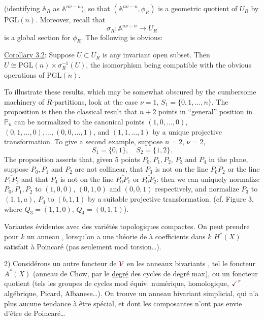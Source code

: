 
(identifying $\mathbb{A}_R$ as $\mathbb{A}^{n\nu-n}$), so that $(\mathbb{A}^{n\nu-n},\phi_R)$ is a geometric quotient of $U_R$ by $\mathrm{PGL}(n)$. Moreover, recall that
\[
\sigma_R:\mathbb{A}^{n\nu-n}\longrightarrow U_R
\]
is a global section for $\phi_R$. The following is obvious:

\uline{Corollary 3.2}: Suppose $U\subset U_R$ is any invariant open subset. Then $U\cong\mathrm{PGL}(n)\times\sigma_R^{-1}(U)$, the isomorphism being compatible with the obvious operations of $\mathrm{PGL}(n)$.

To illustrate these results, which may be somewhat obscured by the cumbersome machinery of $R$-partitions, look at the case $\nu=1$, $S_1=\{0,1,\ldots,n\}$. The proposition is then the classical result that $n+2$ points in ``general'' position in $\mathbb{P}_n$ can be normalized to the canonical points $(1,0,\ldots,0)$, $(0,1,\ldots,0),\ldots,(0,0,\ldots,1)$, and $(1,1,\ldots,1)$ by a unique projective transformation. To give a second example, suppose $n=2$, $\nu=2$,
\[
S_1=\{0,1\},\quad S_2=\{1,2\}.
\]
The proposition asserts that, given 5 points $P_0,P_1,P_2$, $P_3$ and $P_4$ in the plane, suppose $P_0,P_1$ and $P_2$ are not collinear, that $P_3$ is not on the line $\overline{P_0P_2}$ or the line $\overline{P_1P_2}$ and that $P_4$ is not on the line $\overline{P_0P_1}$ or $\overline{P_0P_2}$: then we can uniquely normalize $P_0,P_1,P_2$ to $(1,0,0)$, $(0,1,0)$ and $(0,0,1)$ respectively, and normalize $P_3$ to $(1,1,a)$, $P_4$ to $(b,1,1)$ by a suitable projective transformation. (cf. Figure 3, where $Q_3=(1,1,0)$, $Q_4=(0,1,1)$).


Variantes évidentes avec des variétés topologiques compactes.
On peut prendre pour $k$ un anneau , lorsqu'on a une théorie de  à coefficients dans $k$    $H^*(X)$ satisfait à Poincaré  (pas seulement mod torsion\ldots).

2) Considérons un autre foncteur de $\unsure{\mathcal{V}}$ en les anneaux bivariants , tel le foncteur $A^*(X)$ (anneau de Chow,   par le \uline{degré} des cycles de degré max), ou un foncteur quotient (tels les groupes de cycles mod équiv. numérique, homologique, $\unsure{\checkmark^{\tau}}$ algébrique, Picard, Albanese\ldots). On trouve un anneau bivariant  simplicial, qui n'a plus aucune tendance à être spécial, et dont les composantes n'ont pas  envie d'être de Poincaré\ldots

